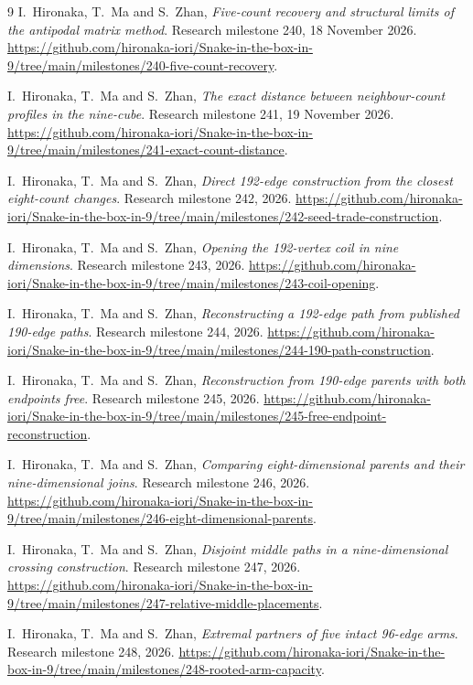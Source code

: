 \documentclass[11pt,a4paper]{article}
\begin{document}
\begin{thebibliography}{9}
I.~Hironaka, T.~Ma and S.~Zhan, \emph{Five-count recovery and structural
limits of the antipodal matrix method}. Research milestone 240,
18 November 2026.
\url{https://github.com/hironaka-iori/Snake-in-the-box-in-9/tree/main/milestones/240-five-count-recovery}.

I.~Hironaka, T.~Ma and S.~Zhan, \emph{The exact distance between
neighbour-count profiles in the nine-cube}. Research milestone 241,
19 November 2026.
\url{https://github.com/hironaka-iori/Snake-in-the-box-in-9/tree/main/milestones/241-exact-count-distance}.

I.~Hironaka, T.~Ma and S.~Zhan, \emph{Direct 192-edge construction
from the closest eight-count changes}. Research milestone 242, 2026.
\url{https://github.com/hironaka-iori/Snake-in-the-box-in-9/tree/main/milestones/242-seed-trade-construction}.

I.~Hironaka, T.~Ma and S.~Zhan, \emph{Opening the 192-vertex coil
in nine dimensions}. Research milestone 243, 2026.
\url{https://github.com/hironaka-iori/Snake-in-the-box-in-9/tree/main/milestones/243-coil-opening}.

I.~Hironaka, T.~Ma and S.~Zhan, \emph{Reconstructing a 192-edge path
from published 190-edge paths}. Research milestone 244, 2026.
\url{https://github.com/hironaka-iori/Snake-in-the-box-in-9/tree/main/milestones/244-190-path-construction}.

I.~Hironaka, T.~Ma and S.~Zhan, \emph{Reconstruction from 190-edge
parents with both endpoints free}. Research milestone 245, 2026.
\url{https://github.com/hironaka-iori/Snake-in-the-box-in-9/tree/main/milestones/245-free-endpoint-reconstruction}.

I.~Hironaka, T.~Ma and S.~Zhan, \emph{Comparing eight-dimensional
parents and their nine-dimensional joins}. Research milestone 246, 2026.
\url{https://github.com/hironaka-iori/Snake-in-the-box-in-9/tree/main/milestones/246-eight-dimensional-parents}.

I.~Hironaka, T.~Ma and S.~Zhan, \emph{Disjoint middle paths in a
nine-dimensional crossing construction}. Research milestone 247, 2026.
\url{https://github.com/hironaka-iori/Snake-in-the-box-in-9/tree/main/milestones/247-relative-middle-placements}.

I.~Hironaka, T.~Ma and S.~Zhan, \emph{Extremal partners of five intact
96-edge arms}. Research milestone 248, 2026.
\url{https://github.com/hironaka-iori/Snake-in-the-box-in-9/tree/main/milestones/248-rooted-arm-capacity}.


\end{thebibliography}
\end{document}
